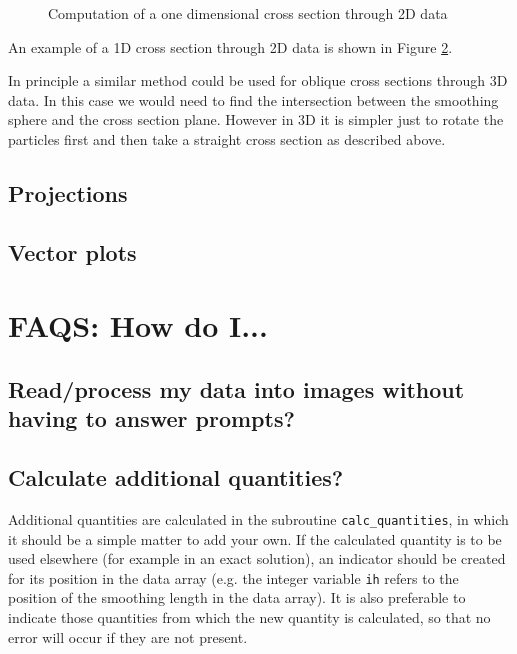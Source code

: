 \documentclass[a4paper,12pt]{article}
\begin{document}
\begin{figure}
\begin{center}
\caption{Computation of a one dimensional cross section through 2D data}
\label{fig:xsec2D}
\end{center}
\end{figure}
 
 An example of a 1D cross section through 2D data is shown in Figure
\ref{fig:xsec2Dexample}.
\begin{figure}
\begin{center}
\label{fig:xsec2Dexample}
\end{center}
\end{figure}

 In principle a similar method could be used for oblique cross sections
through 3D data. In this case we would need to find the intersection
between the smoothing sphere and the cross section plane. However
in 3D it is simpler just to rotate the particles first and then take
a straight cross section as described above.

\subsection{Projections}


\subsection{Vector plots}
 


\section{FAQS: How do I...}

\subsection{Read/process my data into images without having to answer prompts?}


\subsection{Calculate additional quantities?}
 Additional quantities are calculated in the subroutine \verb+calc_quantities+,
in which it should be a simple matter to add your own.
If the calculated quantity is to be used elsewhere (for example in an exact
solution), an indicator should be created for its position in the data array
(e.g. the integer variable \verb+ih+ refers to the position of the smoothing
length in the data array). It is also preferable to indicate those quantities
from which the new quantity is calculated, so that no error will occur if they
are not present.
\end{document}
